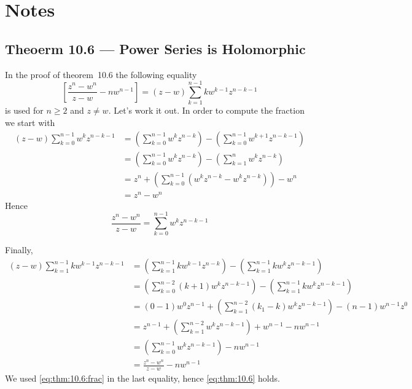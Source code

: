 
\newcommand{\itwopi}{\frac{1}{2\pi}}
\newcommand{\itwopii}{\frac{1}{2\pi i}}

\section{Notes}

\subsection{Theoerm 10.6 --- Power Series is Holomorphic}

In the proof of theorem~10.6 the following equality
\begin{equation} \label{eq:thm:10.6}
\left[ \frac{z^n - w^n}{z-w} - nw^{n-1} \right]
= (z-w)\sum_{k=1}^{n-1} kw^{k-1} z^{n-k-1}
\end{equation}
is used for \(n\geq 2\) and \(z\neq w\). Let's work it out.
In order to compute the fraction we start with
\begin{align*}
(z-w)\sum_{k=0}^{n-1} w^k z^{n-k-1}
&=  \left(\sum_{k=0}^{n-1} w^k z^{n-k}\right)
  - \left(\sum_{k=0}^{n-1} w^{k+1} z^{n-k-1}\right) \\
&=  \left(\sum_{k=0}^{n-1} w^k z^{n-k}\right)
  - \left(\sum_{k=1}^{n} w^{k} z^{n-k}\right) \\
&= z^n + \left(\sum_{k=0}^{n-1} \left(w^k z^{n-k} - w^k z^{n-k}\right)\right) - w^n\\
&= z^n - w^n
\end{align*}
Hence
\begin{equation} \label{eq:thm:10.6:frac}
\frac{z^n - w^n}{z-w} = \sum_{k=0}^{n-1} w^k z^{n-k-1}
\end{equation}

Finally,
\begin{align*}
(z-w)\sum_{k=1}^{n-1} kw^{k-1} z^{n-k-1}
&= \left(\sum_{k=1}^{n-1} kw^{k-1} z^{n-k}\right) -
   \left(\sum_{k=1}^{n-1} kw^{k} z^{n-k-1}\right) \\
&= \left(\sum_{k=0}^{n-2} (k+1)w^{k} z^{n-k-1}\right) -
   \left(\sum_{k=1}^{n-1} kw^{k} z^{n-k-1}\right) \\
&= (0-1)w^0z^{n-1} +
   \left(\sum_{k=1}^{n-2} (k_1-k)w^{k} z^{n-k-1}\right) -
   (n-1)w^{n-1}z^0 \\
&= z^{n-1} + \left(\sum_{k=1}^{n-2} w^kz^{n-k-1}\right) + w^{n-1} - nw^{n-1} \\
&= \left(\sum_{k=0}^{n-1} w^kz^{n-k-1}\right) - nw^{n-1} \\
&= \frac{z^n - w^n}{z-w} - nw^{n-1}
\end{align*}
We used \eqref{eq:thm:10.6:frac} in the last equality,
hence \eqref{eq:thm:10.6} holds.


